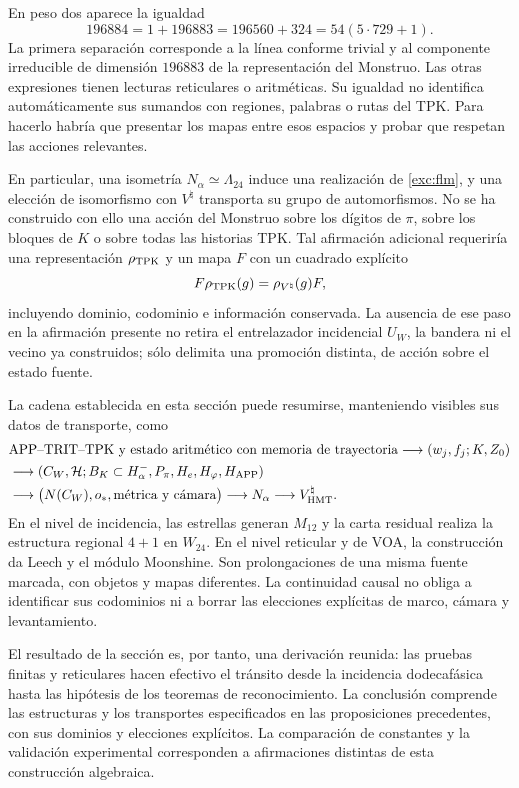 En peso dos aparece la igualdad
\[
 196884=1+196883=196560+324=54(5\cdot729+1).
\]
La primera separación corresponde a la línea conforme trivial y al
componente irreducible de dimensión $196883$ de la representación
del Monstruo. Las otras expresiones tienen lecturas reticulares o
aritméticas. Su igualdad no identifica automáticamente sus sumandos
con regiones, palabras o rutas del TPK. Para hacerlo habría que
presentar los mapas entre esos espacios y probar que respetan las
acciones relevantes.

En particular, una isometría $N_\alpha\simeq\Lambda_{24}$ induce
una realización de \eqref{exc:flm}, y una elección de isomorfismo
con $V^\natural$ transporta su grupo de automorfismos. No se ha
construido con ello una acción del Monstruo sobre los dígitos de
$\pi$, sobre los bloques de $K$ o sobre todas las historias TPK.
Tal afirmación adicional requeriría una representación
$\rho_{\rm TPK}$ y un mapa $F$ con un cuadrado explícito
\[
 F\rho_{\rm TPK}(g)=\rho_{V^\natural}(g)F,
\]
incluyendo dominio, codominio e información conservada. La ausencia
de ese paso en la afirmación presente no retira el entrelazador
incidencial $U_W$, la bandera ni el vecino ya construidos; sólo
delimita una promoción distinta, de acción sobre el estado fuente.

La cadena establecida en esta sección puede resumirse, manteniendo
visibles sus datos de transporte, como
\begin{align*}
 &\text{APP--TRIT--TPK y estado aritmético con memoria de trayectoria}
   \longrightarrow (w_j,f_j;K,Z_0)\\
 &\longrightarrow (C_W,\mathcal H;B_K\subset H^-_\alpha,
                   P_\pi,H_e,H_\varphi,H_{\rm APP})\\
 &\longrightarrow \bigl(N(C_W),o_*,\text{métrica y cámara}\bigr)
   \longrightarrow N_\alpha
   \longrightarrow V^\natural_{\rm HMT}.
\end{align*}
En el nivel de incidencia, las estrellas generan $M_{12}$ y la
carta residual realiza la estructura regional $4+1$ en $W_{24}$.
En el nivel reticular y de VOA, la construcción da Leech y el módulo
Moonshine. Son prolongaciones de una misma fuente marcada, con
objetos y mapas diferentes. La continuidad causal no obliga a
identificar sus codominios ni a borrar las elecciones explícitas
de marco, cámara y levantamiento.

El resultado de la sección es, por tanto, una derivación reunida:
las pruebas finitas y reticulares hacen efectivo el tránsito desde
la incidencia dodecafásica hasta las hipótesis de los teoremas de
reconocimiento. La conclusión comprende las estructuras y los
transportes especificados en las proposiciones precedentes, con sus
dominios y elecciones explícitos. La comparación de constantes y la
validación experimental corresponden a afirmaciones distintas de esta
construcción algebraica.
